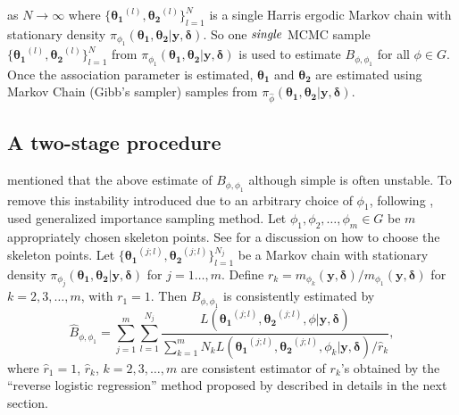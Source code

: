 \documentclass[11pt]{article}
\theoremstyle{remboldstyle}
\newcommand{\bth}{{\boldsymbol{\theta_1}}}
\newcommand{\bthe}{{\boldsymbol{\theta_2}}}
\newcommand{\y}{{\boldsymbol{y}}}
\newcommand{\de}{{\boldsymbol{\delta}}}
\begin{document}
as $N \rightarrow \infty$ where $\{\bth^{(l)}, \bthe^{(l)}\}_{l=1}^{N}$  is a single Harris ergodic Markov chain with stationary density $\pi_{\phi_1}(\bth, \bthe| \y, \de)$. So one $\it{single}$ MCMC sample $\{\bth^{(l)}, \bthe^{(l)}\}_{l=1}^{N}$ from $\pi_{\phi_1}(\bth, \bthe| \y, \de)$ is used to estimate $B_{\phi,\phi_1}$ for all $\phi \in G$. Once the association parameter is estimated, $\mathbf{\bth}$ and $\mathbf{\bthe}$ are estimated using Markov Chain (Gibb's sampler) samples from $\pi_{\hat{\phi}}(\bth, \bthe| \y, \de)$.

\subsection{A two-stage procedure}
\label{subsec:twostage}
\noindent
\cite{roy:2014} mentioned that the above estimate of $B_{\phi,\phi_1}$ although simple is often unstable. To remove this instability introduced due to an arbitrary choice of $\phi_1$, following \cite{doss:2010}, \cite{roy:2014} used generalized importance sampling method. Let $\phi_1, \phi_2, \dots, \phi_m \in G$ be $m$ appropriately chosen skeleton points. See \cite{roy:zhu:2014} for a discussion on how to choose the skeleton points. Let $\{\bth^{(j;l)}, \bthe^{(j;l)}\}_{l=1}^{N_j}$ be a Markov chain with stationary density $\pi_{\phi_j}(\bth, \bthe| \y, \de)$ for $j=1\dots,m$. Define $r_k = m_{\phi_k}(\y, \de)/ m_{\phi_1}(\y, \de) $ for
$k = 2, 3, \dots, m$, with $r_1=1$. Then $B_{\phi, \phi_1}$ is consistently estimated by
\begin{equation}
  \label{eq:bf2}
   \hat{B}_{\phi, \phi_1} = \sum_{j =1}^m \sum_{l =1}^{N_j} \frac{ L(\bth^{(j;l)}, \bthe^{(j;l)}, \phi| \y, \de)}{\sum_{k =1}^m N_k L(\bth^{(j;l)}, \bthe^{(j;l)}, \phi_k| \y, \de)/ \hat{r}_k},
\end{equation}
where $\hat {r}_1 =1$, $\hat{r}_k$, $k = 2, 3, \dots, m$ are consistent estimator of $r_k$'s obtained by the ``reverse logistic regression'' method proposed by \cite{geyer:1994} described in details in the next section.
\end{document}
